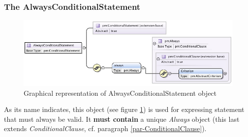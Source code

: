 \documentclass[a4paper,11pt] {article}
\begin{document}
\subsubsection{The AlwaysConditionalStatement}\label{par-AlwaysConditionalStatement}
\begin{figure}[htbp]
\begin{center}
\includegraphics[width=1.1\textwidth]{pictures/AlwaysStatement.jpg} 
\caption{Graphical representation of AlwaysConditionalStatement object}
\label{Pic-AlwaysConditionalStatement}
\end{center}
\end{figure}
As its name indicates, this object (see figure \ref{Pic-AlwaysConditionalStatement}) is used for expressing statement that must always be valid. It {\bf must contain} a unique {\it Always} object (this last extends {\it ConditionalClause}, cf. paragraph \ref{par-ConditionalClause}).
\end{document}
